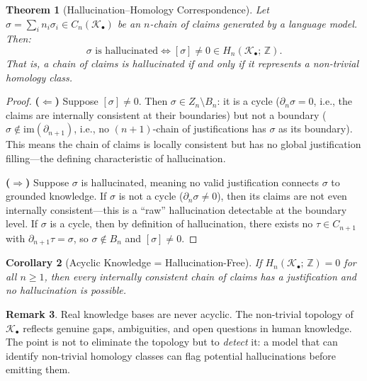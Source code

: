 \documentclass[11pt,a4paper,twocolumn]{article}
\theoremstyle{plain}
\newtheorem{theorem}{Theorem}[section]
\newtheorem{corollary}[theorem]{Corollary}
\theoremstyle{definition}
\newtheorem{remark}[theorem]{Remark}
\newcommand{\im}{\mathrm{im}}
\begin{document}
\begin{theorem}[Hallucination--Homology Correspondence]\label{thm:main}
Let $\sigma = \sum_i n_i \sigma_i \in C_n(\mathcal{K}_\bullet)$ be an $n$-chain of claims generated by a language model. Then:
\[
  \sigma \text{ is hallucinated} \iff [\sigma] \neq 0 \in H_n(\mathcal{K}_\bullet;\, \mathbb{Z}).
\]
That is, a chain of claims is hallucinated if and only if it represents a non-trivial homology class.
\end{theorem}

\begin{proof}
\textbf{($\Leftarrow$)} Suppose $[\sigma] \neq 0$. Then $\sigma \in Z_n \setminus B_n$: it is a cycle ($\partial_n \sigma = 0$, i.e., the claims are internally consistent at their boundaries) but not a boundary ($\sigma \notin \im(\partial_{n+1})$, i.e., no $(n+1)$-chain of justifications has $\sigma$ as its boundary). This means the chain of claims is locally consistent but has no global justification filling---the defining characteristic of hallucination.

\textbf{($\Rightarrow$)} Suppose $\sigma$ is hallucinated, meaning no valid justification connects $\sigma$ to grounded knowledge. If $\sigma$ is not a cycle ($\partial_n \sigma \neq 0$), then its claims are not even internally consistent---this is a ``raw'' hallucination detectable at the boundary level. If $\sigma$ is a cycle, then by definition of hallucination, there exists no $\tau \in C_{n+1}$ with $\partial_{n+1}\tau = \sigma$, so $\sigma \notin B_n$ and $[\sigma] \neq 0$.
\end{proof}

\begin{corollary}[Acyclic Knowledge = Hallucination-Free]\label{cor:acyclic}
If $H_n(\mathcal{K}_\bullet;\, \mathbb{Z}) = 0$ for all $n \geq 1$, then every internally consistent chain of claims has a justification and no hallucination is possible.
\end{corollary}

\begin{remark}
Real knowledge bases are never acyclic. The non-trivial topology of $\mathcal{K}_\bullet$ reflects genuine gaps, ambiguities, and open questions in human knowledge. The point is not to eliminate the topology but to \emph{detect} it: a model that can identify non-trivial homology classes can flag potential hallucinations before emitting them.
\end{remark}

\end{document}
